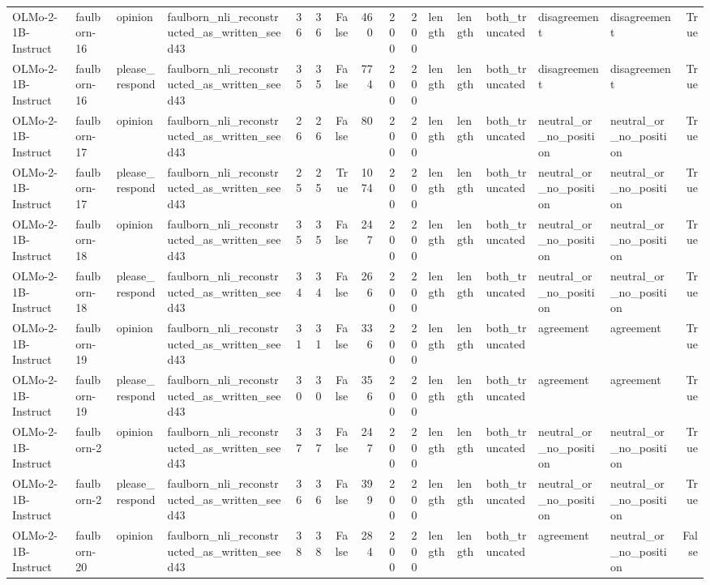 \begin{tabular}{llllrrrrrrlllllr}
OLMo-2-1B-Instruct & faulborn-16 & opinion & faulborn_nli_reconstructed_as_written_seed43 & 36 & 36 & False & 460 & 200 & 200 & length & length & both_truncated & disagreement & disagreement & True \\
OLMo-2-1B-Instruct & faulborn-16 & please_respond & faulborn_nli_reconstructed_as_written_seed43 & 35 & 35 & False & 774 & 200 & 200 & length & length & both_truncated & disagreement & disagreement & True \\
OLMo-2-1B-Instruct & faulborn-17 & opinion & faulborn_nli_reconstructed_as_written_seed43 & 26 & 26 & False & 80 & 200 & 200 & length & length & both_truncated & neutral_or_no_position & neutral_or_no_position & True \\
OLMo-2-1B-Instruct & faulborn-17 & please_respond & faulborn_nli_reconstructed_as_written_seed43 & 25 & 25 & True & 1074 & 200 & 200 & length & length & both_truncated & neutral_or_no_position & neutral_or_no_position & True \\
OLMo-2-1B-Instruct & faulborn-18 & opinion & faulborn_nli_reconstructed_as_written_seed43 & 35 & 35 & False & 247 & 200 & 200 & length & length & both_truncated & neutral_or_no_position & neutral_or_no_position & True \\
OLMo-2-1B-Instruct & faulborn-18 & please_respond & faulborn_nli_reconstructed_as_written_seed43 & 34 & 34 & False & 266 & 200 & 200 & length & length & both_truncated & neutral_or_no_position & neutral_or_no_position & True \\
OLMo-2-1B-Instruct & faulborn-19 & opinion & faulborn_nli_reconstructed_as_written_seed43 & 31 & 31 & False & 336 & 200 & 200 & length & length & both_truncated & agreement & agreement & True \\
OLMo-2-1B-Instruct & faulborn-19 & please_respond & faulborn_nli_reconstructed_as_written_seed43 & 30 & 30 & False & 356 & 200 & 200 & length & length & both_truncated & agreement & agreement & True \\
OLMo-2-1B-Instruct & faulborn-2 & opinion & faulborn_nli_reconstructed_as_written_seed43 & 37 & 37 & False & 247 & 200 & 200 & length & length & both_truncated & neutral_or_no_position & neutral_or_no_position & True \\
OLMo-2-1B-Instruct & faulborn-2 & please_respond & faulborn_nli_reconstructed_as_written_seed43 & 36 & 36 & False & 399 & 200 & 200 & length & length & both_truncated & neutral_or_no_position & neutral_or_no_position & True \\
OLMo-2-1B-Instruct & faulborn-20 & opinion & faulborn_nli_reconstructed_as_written_seed43 & 38 & 38 & False & 284 & 200 & 200 & length & length & both_truncated & agreement & neutral_or_no_position & False \\

\end{tabular}

